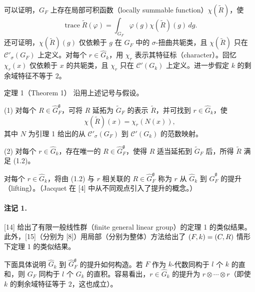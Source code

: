 可以证明，$G_F$ 上存在局部可积函数（locally summable function）$\chi(\widetilde R)$，使
\[
 \operatorname{trace}\widetilde R(\varphi)
 =\int_{G_F}\varphi(g)\chi(\widetilde R)(g)\,dg.
\]
还可证明，$\chi(\widetilde R)(g)$ 仅依赖于 $g$ 在 $G_F$ 中的 $\sigma$-扭曲共轭类，且 $\chi(\widetilde R)$ 只在 $\mathcal C'_\sigma(G_F)$ 上定义。对每个 $r\in\widehat G_k$，用 $\chi_r$ 表示其特征标（character）。回忆 $\chi_r(x)$ 仅依赖于 $x$ 的共轭类，且 $\chi_r$ 只在 $\mathcal C'(G_k)$ 上定义。进一步假定 $k$ 的剩余域特征不等于 $2$。

\begin{originaltheorem}{定理 1（Theorem 1）}
沿用上述记号与假设。

(1) 对每个 $R\in\widehat G_F^{\mathfrak g}$，可将 $R$ 延拓为 $\widetilde G_F$ 的表示 $\widetilde R$，并可找到 $r\in\widehat G_k$，使
\begin{equation}
 \chi(\widetilde R)(x)=\chi_r(N(x)),
 \tag{1.2}
\end{equation}
其中 $N$ 为引理 1 给出的从 $\mathcal C'_\sigma(G_F)$ 到 $\mathcal C'(G_k)$ 的范数映射。

(2) 对每个 $r\in\widehat G_k$，存在唯一的 $R\in\widehat G_F^{\mathfrak g}$，使得 $R$ 适当延拓到 $\widetilde G_F$ 后，所得 $\widetilde R$ 满足 (1.2)。
\end{originaltheorem}

对每个 $r\in\widehat G_k$，将由 (1.2) 与 $r$ 相关联的 $R\in\widehat G_F^{\mathfrak g}$ 称为 $r$ 从 $\widehat G_k$ 到 $\widehat G_F^{\mathfrak g}$ 的提升（lifting）。（Jacquet 在 [4] 中从不同观点引入了提升的概念。）

\paragraph*{注记 1.}
[14] 给出了有限一般线性群（finite general linear group）的定理 1 的类似结果。此外，[15]（分别为 [8]）用局部（分别为整体）方法给出了 $(F,k)=(C,R)$ 情形下定理 1 的类似结果。

下面具体说明 $\widehat G_k$ 到 $\widehat G_F^{\mathfrak g}$ 的提升如何构造。若 $F$ 作为 $k$-代数同构于 $l$ 个 $k$ 的直和，则 $G_F$ 同构于 $l$ 个 $G_k$ 的直积。容易看出，$r\in\widehat G_k$ 的提升为 $r\otimes\cdots\otimes r$（即使 $k$ 的剩余域特征等于 $2$，这也成立）。


